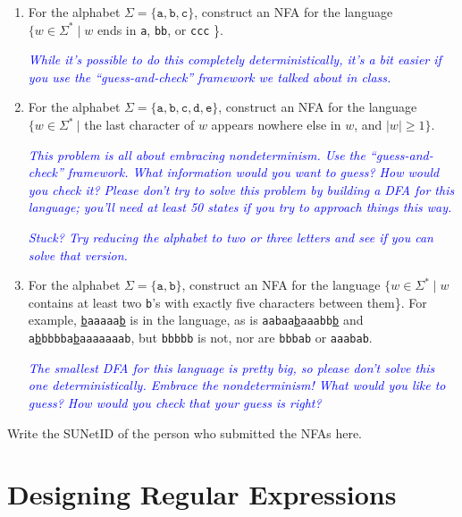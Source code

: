 \documentclass{article}
\renewcommand{\(}{\left(}
\renewcommand{\)}{\right)}
\theoremstyle{plain}
\theoremstyle{plain}
\theoremstyle{definition}
\newcommand{\annotate}[1]{\textit{\textcolor{blue}{#1}}}
\newcommand{\ttt}[1]{\texttt{#1}}
\begin{document}
\begin{enumerate}[label*=\roman*.,ref=\roman*]
    \item For the alphabet $\Sigma = \{\ttt{a}, \ttt{b}, \ttt{c}\}$, construct an NFA for the language $\{ w \in \Sigma^* \mid w$ ends in \ttt{a}, \ttt{bb}, or \ttt{ccc} \}.
    
    \annotate{While it's possible to do this completely deterministically, it's a bit easier if you use the ``guess-and-check'' framework we talked about in class.}

    \item For the alphabet $\Sigma = \{\ttt{a}, \ttt{b}, \ttt{c}, \ttt{d}, \ttt{e}\}$, construct an NFA for the language $\{ w \in \Sigma^*\ |$ the last character of $w$ appears nowhere else in $w$, and $|w| \ge 1 \}$. 
    
    \annotate{This problem is all about embracing nondeterminism. Use the ``guess-and-check'' framework. What information would you want to guess? How would you check it? Please don't try to solve this problem by building a DFA for this language; you'll need at least 50 states if you try to approach things this way.}
    
    \annotate{Stuck? Try reducing the alphabet to two or three letters and see if you can solve that version.}

    \item For the alphabet $\Sigma = \{\ttt{a}, \ttt{b}\}$, construct an NFA for the language $\{w \in \Sigma^* \mid w$ contains at least two \ttt{b}'s with exactly five characters between them\}. For example, \ttt{\underline{b}aaaaa\underline{b}} is in the language, as is \ttt{aabaa\underline{b}aaabb\underline{b}} and \ttt{a\underline{b}bbbba\underline{b}aaaaaaab}, but \ttt{bbbbb} is not, nor are \ttt{bbbab} or \ttt{aaabab}.
    
    \annotate{The smallest DFA for this language is pretty big, so please don't solve this one deterministically. Embrace the nondeterminism! What would you like to guess? How would you check that your guess is right?}

\end{enumerate}

\begin{shaded}
Write the SUNetID of the person who submitted the NFAs here. 
\end{shaded}

\pagebreak

\section{Designing Regular Expressions}
\end{document}
